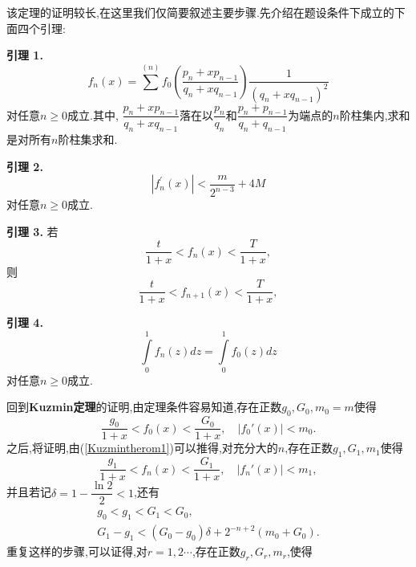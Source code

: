 该定理的证明较长,在这里我们仅简要叙述主要步骤.先介绍在题设条件下成立的下面四个引理:\par
\textbf{引理 1.  }\textsuperscript{\cite{Iosifescu}}
\begin{equation}\label{lemma1}
    f_{n}\left(x\right)=\sum^{\left(n\right)}f_{0}\left(\frac{p_{n}+x p_{n-1}}{q_{n}+x q_{n-1}}\right)\frac{1}{\left(q_{n}+x q_{n-1}\right)^{2}}
\end{equation}
对任意$n\geqslant 0$成立.其中, $\dfrac{p_{n}+xp_{n-1}}{q_{n}+xq_{n-1}}$落在以$\dfrac{p_{n}}{q_{n}}$和$\dfrac{p_{n}+p_{n-1}}{q_{n}+q_{n-1}}$为端点的$n$阶柱集内,求和是对所有$n$阶柱集求和.\par
\par
\textbf{引理 2.  }\textsuperscript{\cite{Iosifescu}}
\begin{equation}\label{lemma2}
    \left|f_{n}^{'}(x)\right|<\frac{m}{2^{n-3}}+4M
\end{equation}
对任意$n\geqslant0$成立.\par
\par
\textbf{引理 3.  }\textsuperscript{\cite{Iosifescu}}
若
\begin{equation}\label{lemma3eq1}
    \frac{t}{1+x}<f_{n}(x)<\frac{T}{1+x},
\end{equation}
则
\begin{equation}\label{lemma3eq2}
    \frac{t}{1+x}<f_{n+1}(x)<\frac{T}{1+x},
\end{equation}
\par
\textbf{引理 4.  }\textsuperscript{\cite{Iosifescu}}
\begin{equation}\label{lemma4}
    \int\limits_{0}^{1}f_{n}(z)dz=\int\limits_{0}^{1}f_{0}(z)dz
\end{equation}
对任意$n\geqslant0$成立.\par
\par
回到\textbf{Kuzmin定理}的证明,由定理条件容易知道,存在正数$g_0,G_0,m_0=m$使得
\begin{equation}\label{Kuzmintherom1}
    \frac{g_0}{1+x}<f_0(x)<\frac{G_0}{1+x},\quad|f_0'(x)|<m_0.
\end{equation}
之后,将证明,由(\ref{Kuzmintherom1})可以推得,对充分大的$n$,存在正数$g_1,G_1,m_1$使得
$$\frac{g_1}{1+x}<f_n(x)<\frac{G_1}{1+x},\quad|f_n'(x)|<m_1,$$
并且若记$\delta=1-\dfrac{\ln2}{2}<1$,还有
\begin{align*}
    g_0<g_1<G_1<G_0, \\
    G_1-g_1<(G_0-g_0)\delta+2^{-n+2}(m_0+G_0).
\end{align*}
重复这样的步骤,可以证得,对$r=1,2\cdots$,存在正数$g_r,G_r,m_r$,使得
